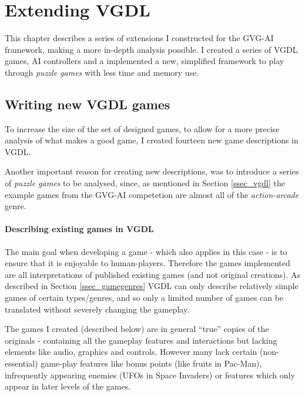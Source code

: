 \documentclass[a4paper,titlepage,final]{report}
\begin{document}

\chapter{Extending VGDL}
\label{ch_extending}
This chapter describes a series of extensions I constructed for the GVG-AI framework, making a more in-depth analysis possible.
I created a series of VGDL games, AI controllers and a implemented a new, simplified framework to play through \textit{puzzle games} with less time and memory use.


\section{Writing new VGDL games}
\label{sec_writingnewvgdl}
To increase the size of the set of designed games, to allow for a more precise analysis of what makes a good game, I created fourteen new game descriptions in VGDL. 

Another important reason for creating new descriptions, was to introduce a series of \emph{puzzle games} to be analysed, since, as mentioned in Section \ref{ssec_vgdl} the example games from the GVG-AI competetion are almost all of the \textit{action-arcade} genre.


\subsubsection*{Describing existing games in VGDL}
The main goal when developing a game - which also applies in this case - is to ensure that it is enjoyable to human-players. 
Therefore the games implemented are all interpretations of published existing games (and not original creations).
As described in Section \ref{ssec_gamegenres} VGDL can only describe relatively simple games of certain types/genres, and so only a limited number of games can be translated without severely changing the gameplay.

The games I created (described below) are in general ``true'' copies of the originals - containing all the gameplay features and interactions but lacking elements like audio, graphics and controls. 
However many lack certain (non-essential) game-play features like bonus points (like fruits in Pac-Man), infrequently appearing enemies (UFOs in Space Invaders) or features which only appear in later levels of the games.
\end{document}

